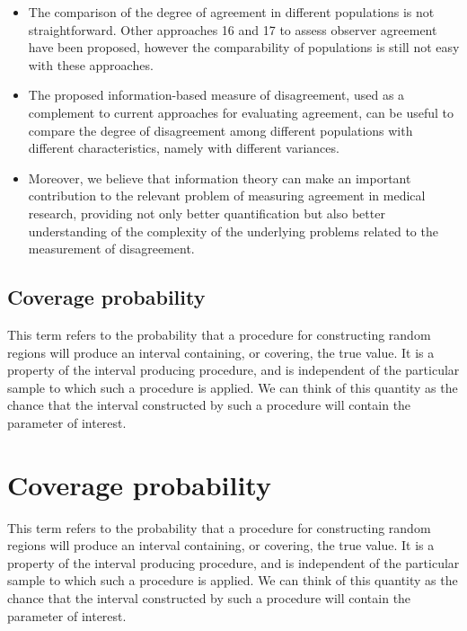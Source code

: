\documentclass[MAIN.tex]{subfiles}
\begin{document}
\begin{itemize}
		\item The comparison of the degree of agreement in different populations is not straightforward. Other approaches 16 and 17 to assess observer agreement have been proposed, however the comparability of populations is still not easy with these approaches.
		
		\item The proposed information-based measure of disagreement, used as a complement to current approaches for evaluating agreement, can be useful to compare the degree of disagreement among different populations with different characteristics, namely with different variances.
		
		\item Moreover, we believe that information theory can make an important contribution to the relevant problem of measuring agreement in medical research, providing not only better quantification but also better understanding of the complexity of the underlying problems related to the measurement of disagreement.
	\end{itemize}
	
	
	
	\subsection{Coverage probability}
	This term refers to the probability that a procedure for 
	constructing random regions will produce an interval containing, or covering, the 
	true value. It is a property of the interval producing procedure, and is 
	independent of the particular sample to which such a procedure is applied. We 
	can think of this quantity as the chance that the interval constructed by such a 
	procedure will contain the parameter of interest.
	
	
	\section{Coverage probability}
	This term refers to the probability that a procedure for 
	constructing random regions will produce an interval containing, or covering, the 
	true value. It is a property of the interval producing procedure, and is 
	independent of the particular sample to which such a procedure is applied. We 
	can think of this quantity as the chance that the interval constructed by such a 
	procedure will contain the parameter of interest.
	
\end{document}
